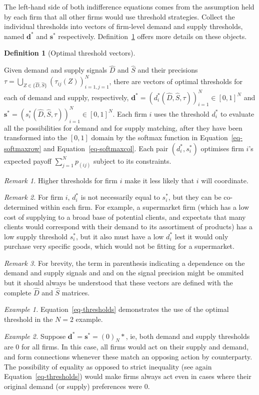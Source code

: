 \documentclass[
]{article}
\theoremstyle{plain}
\theoremstyle{definition}
\newtheorem{definition}{Definition}[section]
\theoremstyle{remark}
\begin{document}
The left-hand side of both indifference equations comes from the
assumption held by each firm that all other firms would use threshold
strategies. Collect the individual thresholds into vectors of firm-level
demand and supply thresholds, named \(\mathbf{d}^*\) and
\(\mathbf{s}^*\) respectively. Definition~\ref{def-optmthresh} offers
more details on these objects.

\begin{definition}[Optimal threshold
vectors]\protect\hypertarget{def-optmthresh}{}\label{def-optmthresh}

Given demand and supply signals \(\hat{D}\) and \(\hat{S}\) and their
precisions
\(\tau = \bigcup_{Z \in \{\hat{D}, \hat{S}\}} (\tau_{ij}(Z))_{i=1, j=1}^N\),
there are vectors of optimal thresholds for each of demand and supply,
respectively,
\(\mathbf{d}^* = (d_i^*(\hat{D}, \hat{S}, \tau))_{i=1}^N \in [0, 1]^N\)
and
\(\mathbf{s}^* = (s_i^*(\hat{D}, \hat{S}, \tau))_{i=1}^N \in [0, 1]^N\).
Each firm \(i\) uses the threshold \(d_i^*\) to evaluate all the
possibilities for demand and for supply matching, after they have been
transformed into the \([0, 1]\) domain by the softmax function in
Equation~\ref{eq-softmaxrow} and Equation~\ref{eq-softmaxcol}. Each pair
\((d_i^*, s_i^*)\) optimises firm \(i\)'s expected payoff
\(\sum_{j=1}^N p_(ij)\) subject to its constraints.

\emph{Remark 1.} Higher thresholds for firm \(i\) make it less likely
that \(i\) will coordinate.

\emph{Remark 2.} For firm \(i\), \(d_i^*\) is not necessarily equal to
\(s_i^*\), but they can be co-determined within each firm. For example,
a supermarket firm (which has a low cost of supplying to a broad base of
potential clients, and expectats that many clients would correspond with
their demand to its assortiment of products) has a low supply threshold
\(s_i^*\), but it also must have a low \(d_i^*\) lest it would only
purchase very specific goods, which would not be fitting for a
supermarket.

\emph{Remark 3.} For brevity, the term in parenthesis indicating a
dependence on the demand and supply signals and and on the signal
precision might be ommited but it should always be understood that these
vectors are defined with the complete \(\hat{D}\) and \(\hat{S}\)
matrices.

\emph{Example 1.} Equation~\ref{eq-thresholds} demonstrates the use of
the optimal threshold in the \(N=2\) example.

\emph{Example 2.} Suppose
\(\mathbf{d}^{*} = \mathbf{s}^{*} = (0)_{N}*\), ie, both demand and
supply thresholds are 0 for all firms. In this case, all firms would act
on their supply and demand, and form connections whenever these match an
opposing action by counterparty. The possibility of equality as opposed
to strict inequality (see again Equation~\ref{eq-thresholds}) would make
firms always act even in cases where their original demand (or supply)
preferences were \(0\).


\end{definition}
\end{document}
